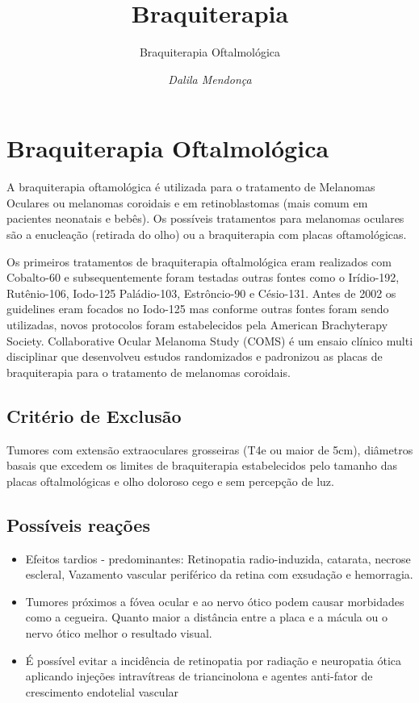 \documentclass[11pt,a4paper]{article}
\title{\LobsterTwo\Huge{Braquiterapia}}
\author{\LobsterTwo\Large{Braquiterapia Oftalmológica}}
\date{\LobsterTwo\textit{Dalila Mendonça}}
\begin{document}
	\maketitle

    \section{Braquiterapia Oftalmológica}


    A braquiterapia oftamológica é utilizada para o tratamento de Melanomas Oculares ou melanomas coroidais e em retinoblastomas (mais comum em pacientes neonatais e bebês). Os possíveis tratamentos para melanomas oculares são a enucleação (retirada do olho) ou a braquiterapia com placas oftamológicas. 
    
    Os primeiros tratamentos de braquiterapia oftalmológica eram realizados com Cobalto-60 e subsequentemente foram testadas outras fontes como o Irídio-192, Rutênio-106, Iodo-125  Paládio-103, Estrôncio-90 e Césio-131. Antes de 2002 os guidelines eram focados no Iodo-125 mas conforme outras fontes foram sendo utilizadas, novos protocolos foram estabelecidos pela American Brachyterapy Society. Collaborative Ocular Melanoma Study (COMS) é um ensaio clínico multi disciplinar que desenvolveu estudos randomizados e padronizou as placas de braquiterapia para o tratamento de melanomas coroidais.


    \subsection{Critério de Exclusão}

    Tumores com extensão extraoculares grosseiras (T4e ou maior de 5cm), diâmetros basais que excedem os limites de braquiterapia estabelecidos pelo tamanho das placas oftalmológicas e olho doloroso cego e sem percepção de luz.

\subsection{Possíveis reações}


    \begin{itemize}
        \item Efeitos tardios - predominantes: Retinopatia radio-induzida, catarata, necrose escleral, Vazamento vascular periférico da retina com exsudação e hemorragia.
        \item Tumores próximos a fóvea ocular e ao nervo ótico podem causar morbidades como a cegueira. Quanto maior a distância entre a placa e a mácula ou o nervo ótico melhor o resultado visual.
        \item É possível evitar a incidência de retinopatia por radiação e neuropatia ótica aplicando injeções intravítreas de triancinolona e agentes anti-fator de crescimento endotelial vascular
    \end{itemize}
\end{document}
